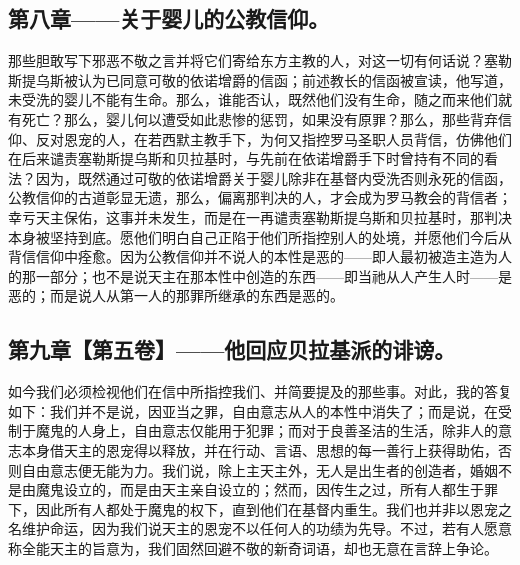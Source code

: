 
\subsection{第八章——关于婴儿的公教信仰。}

那些胆敢写下邪恶不敬之言并将它们寄给东方主教的人，对这一切有何话说？塞勒斯提乌斯被认为已同意可敬的依诺增爵的信函；前述教长的信函被宣读，他写道，未受洗的婴儿不能有生命。那么，谁能否认，既然他们没有生命，随之而来他们就有死亡？那么，婴儿何以遭受如此悲惨的惩罚，如果没有原罪？那么，那些背弃信仰、反对恩宠的人，在若西默主教手下，为何又指控罗马圣职人员背信，仿佛他们在后来谴责塞勒斯提乌斯和贝拉基时，与先前在依诺增爵手下时曾持有不同的看法？因为，既然通过可敬的依诺增爵关于婴儿除非在基督内受洗否则永死的信函，公教信仰的古道彰显无遗，那么，偏离那判决的人，才会成为罗马教会的背信者；幸亏天主保佑，这事并未发生，而是在一再谴责塞勒斯提乌斯和贝拉基时，那判决本身被坚持到底。愿他们明白自己正陷于他们所指控别人的处境，并愿他们今后从背信信仰中痊愈。因为公教信仰并不说人的本性是恶的——即人最初被造主造为人的那一部分；也不是说天主在那本性中创造的东西——即当祂从人产生人时——是恶的；而是说人从第一人的那罪所继承的东西是恶的。\par


\subsection{第九章【第五卷】——他回应贝拉基派的诽谤。}

如今我们必须检视他们在信中所指控我们、并简要提及的那些事。对此，我的答复如下：我们并不是说，因亚当之罪，自由意志从人的本性中消失了；而是说，在受制于魔鬼的人身上，自由意志仅能用于犯罪；而对于良善圣洁的生活，除非人的意志本身借天主的恩宠得以释放，并在行动、言语、思想的每一善行上获得助佑，否则自由意志便无能为力。我们说，除上主天主外，无人是出生者的创造者，婚姻不是由魔鬼设立的，而是由天主亲自设立的；然而，因传生之过，所有人都生于罪下，因此所有人都处于魔鬼的权下，直到他们在基督内重生。我们也并非以恩宠之名维护命运，因为我们说天主的恩宠不以任何人的功绩为先导。不过，若有人愿意称全能天主的旨意为，我们固然回避不敬的新奇词语，却也无意在言辞上争论。\par


